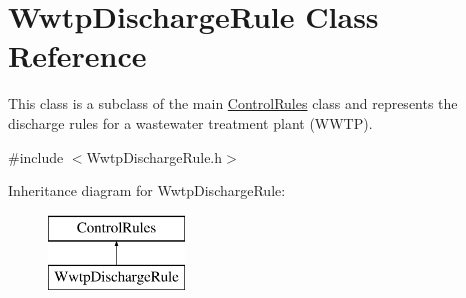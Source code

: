 \hypertarget{classWwtpDischargeRule}{}\section{Wwtp\+Discharge\+Rule Class Reference}
\label{classWwtpDischargeRule}


This class is a subclass of the main {\ttfamily \mbox{\hyperlink{classControlRules}{Control\+Rules}}} class and represents the discharge rules for a wastewater treatment plant (W\+W\+TP).  




{\ttfamily \#include $<$Wwtp\+Discharge\+Rule.\+h$>$}

Inheritance diagram for Wwtp\+Discharge\+Rule\+:\begin{figure}[H]
\begin{center}
\leavevmode
\includegraphics[height=2.000000cm]{classWwtpDischargeRule}
\end{center}
\end{figure}
